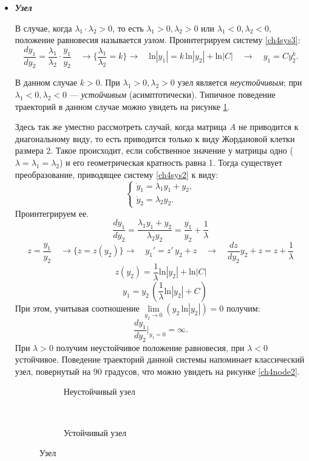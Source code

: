 \begin{itemize}
\item  \textbf{\textit{Узел}}

В случае, когда $\lambda_1 \cdot \lambda_2 > 0$, то есть $\lambda_1 > 0 ,  \lambda_2 > 0$ или $\lambda_1 < 0 ,  \lambda_2 < 0,$ положение равновесия называется \textit{узлом}. Проинтегрируем систему \eqref{ch4sys3}:
$$
\frac{dy_1}{dy_2} = \frac{\lambda_1 }{ \lambda_2} \cdot \frac{y_1}{y_2} \quad \rightarrow  \Big \{\frac{\lambda_1 }{ \lambda_2} = k \Big \}  \rightarrow \quad\text{ln}|y_1| =  k \, \text{ln}|y_2|  +  \text{ln}|C|  \quad \rightarrow \quad y_1 = C y_2^k.
$$

В данном случае $k>0.$ При $ \lambda_1 >0,  \lambda_2 > 0 $ узел является \textit{неустойчивым}; при $ \lambda_1 < 0 ,  \lambda_2 < 0$ --- \textit{устойчивым} (асимптотически). Типичное поведение траекторий в данном случае можно увидеть на рисунке \ref{ch4node1}.

Здесь так же уместно рассмотреть случай, когда матрица $A$ не приводится к диагональному виду, то есть приводится только к виду Жордановой клетки размера 2. Такое происходит, если собственное значение у матрицы одно ($\lambda = \lambda_1 = \lambda_2$) и его геометрическая кратность равна 1. Тогда существует преобразование, приводящее систему \eqref{ch4sys2} к виду:
$$
\begin{cases}
\dot y_1 = \lambda_1 y_1 + y_2 , \\
\dot y_2 = \lambda_2 y_2.
\end{cases}
$$
Проинтегрируем ее.
$$
\frac{dy_1}{dy_2} = \frac{\lambda_1  y_1 +y_2}{ \lambda_2 y_2} = \frac{y_1 }{ y_2} + \frac{1}{\lambda}
$$
$$
z = \frac{y_1 }{ y_2} \quad \rightarrow  \Big \{  z = z(y_2) \Big \}  \rightarrow \quad y_1' = z' \, y_2 + z \quad \rightarrow \quad \frac{dz}{dy_2} y_2 + z = z + \frac{1}{\lambda} 
$$
$$
 z(y_2) =  \frac{1}{\lambda} \text{ln}|y_2| +  \text{ln}|C|
$$
$$
 \quad y_1 = y_2 \, (\frac{1}{\lambda} \text{ln}|y_2| +  C)
$$
При этом, учитывая соотношение $ \lim\limits_{y_2  \rightarrow 0 } (y_2 \,  \text{ln}|y_2|) = 0 $ получим: 
$$
\frac{dy_1}{dy_2} \Big |_{y_1 = 0} = \infty.
$$
При $\lambda > 0$ получим неустойчивое положение равновесия, при $\lambda < 0$ устойчивое. Поведение траекторий данной системы напоминает классический узел, повернутый на 90 градусов,  что можно увидеть на рисунке \ref{ch4node2}.

\begin{figure}[h]
	\centering
	
	\begin{subfigure}[t]{0.4\textwidth}
	\caption{Неустойчивый узел}
	\end{subfigure}
	~ ~ ~ ~               
	\begin{subfigure}[t]{0.4\textwidth}
	\caption{Устойчивый узел}
	\end{subfigure}
	\caption{Узел}\label{ch4node1}
	

\end{figure}
\end{itemize}
